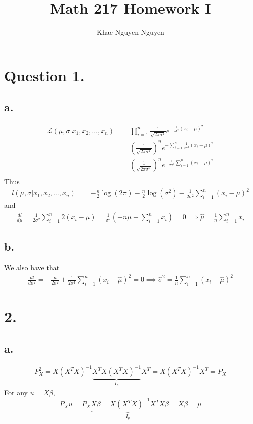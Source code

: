\documentclass[11pt]{article}
\title{\textbf{Math 217 Homework I}}
\author{Khac Nguyen Nguyen}
\date{}
\theoremstyle{mystyle}
\theoremstyle{definition}
\begin{document}
\section*{Question 1.}
\subsection*{a.}
\begin{align*}
  \mathcal{L}(\mu, \sigma | x_1, x_2, \hdots, x_n) &= \prod_{i=1}^n \displaystyle\frac{1}{\sqrt{2\pi\sigma^2}} e^{-\frac{1}{2\sigma^2} (x_i-\mu)^2} \\
  &= \left(\displaystyle\frac{1}{\sqrt{2\pi\sigma^2}} \right)^n e^{-\sum_{i=1}^n \frac{1}{2\sigma^2} (x_i -\mu)^2} \\
  &= \left(\displaystyle\frac{1}{\sqrt{2 \pi \sigma^2}} \right)^n e^{-\frac{1}{2\sigma^2} \sum_{i=1}^n (x_i-\mu)^2} \\
\end{align*}
Thus 
\begin{align*}
  l(\mu, \sigma | x_1, x_2, \hdots, x_n) &= - \displaystyle\frac{n}{2} \log(2\pi) - \displaystyle\frac{n}{2} \log(\sigma^2) - \frac{1}{2\sigma^2} \sum_{i=1}^n (x_i-\mu)^2 
\end{align*}
and 
\begin{align*}
  \displaystyle\frac{dl}{d\mu} = \displaystyle\frac{1}{2\sigma^2} \sum_{i=1}^n 2(x_i-\mu) = \displaystyle\frac{1}{\sigma^2} \left(-n \mu + \sum_{i=1}^n x_i \right) = 0 \implies \hat \mu= \displaystyle\frac{1}{n} \sum_{i=1}^n x_i
\end{align*}
\subsection*{b.}
We also have that 
\begin{align*}
  \displaystyle\frac{dl}{d\sigma^2} = - \displaystyle\frac{n}{2 \sigma^2} + \displaystyle\frac{1}{2\sigma^4} \sum_{i=1}^n (x_i -\hat \mu)^2 = 0 \implies \hat \sigma^2 = \displaystyle\frac{1}{n} \sum_{i=1}^n (x_i-\hat \mu ) ^2
\end{align*}
\pagebreak
\section*{2.}
\subsection*{a.}
\[
  P_X^2 = X (X^T X)^{-1} \underbrace{X^T X (X^T X)^{-1}}_{I_p} X^T = X (X^T X)^{-1} X^T = P_X 
\]
For any $u = X\beta$, 
\[
  P_X u = P_X \underbrace{X \beta = X (X^T X)^{-1} X^T X}_{I_p} \beta = X\beta = \mu
\]
\end{document}
